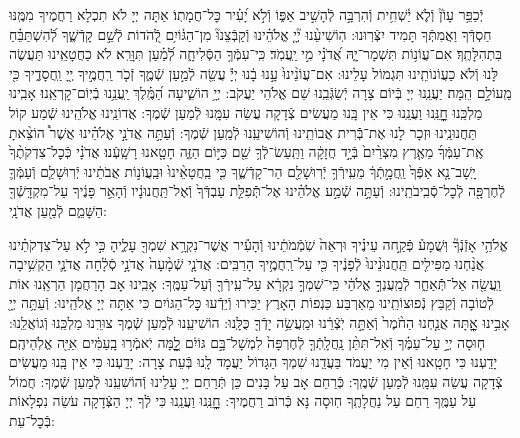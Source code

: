 \documentclass[twoside, openany, parskip=half, 11pt]{book}
\begin{document}
יְֿכַפֵּ֥ר עָוֹן֘ וְֿלֹ֢א יַ֫שְׁחִ֥ית וְֿהִרְבָּ֣ה לְֿהָשִׁ֣יב אַפּ֑וֹ וְֿלֹ֣א יָ֝עִ֗יר כׇּל־חֲמָתֽוֹ׃ אַתָּה יְיָ לֹא תִכְלָא רַחֲמֶיךָ מִמֶּֽנּוּ חַסְדְּֿךָ וַאֲמִתְּֿךָ תָּמִיד יִצְּֿרֽוּנוּ: הֽוֹשִׁיעֵ֨נוּ יְ֘יָ֤ אֱלֹהֵ֗ינוּ וְֿקַבְּֿצֵנוּ֘ מִן־הַגּ֫וֹיִ֥ם לְֿ֭הֹדוֹת לְֿשֵׁ֣ם קָדְֿשֶׁ֑ךָ לְֿ֝הִשְׁתַּבֵּ֗חַ בִּתְהִלָּתֶֽךָ׃
אִם־עֲוֹנ֥וֹת תִּשְׁמָר־יָ֑הּ אֲ֝דֹנָ֗י מִ֣י יַֽעֲמֹֽד׃ כִּֽי־עִמְּֿךָ֥ הַסְּֿלִיחָ֑ה לְֿ֝מַ֗עַן תִּוָּרֵֽא׃ לֹא כַחֲטָאֵֽינוּ תַּעֲשֶׂה לָּנוּ וְֿלֹא כַעֲוֹנוֹתֵֽינוּ תִּגְמוֹל עָלֵינוּ:
אִם־עֲוֹנֵ֨ינוּ֙ עָ֣נוּ בָ֔נוּ יְיָ֕ עֲשֵׂ֖ה לְֿמַ֣עַן שְֿׁמֶ֑ךָ זְֿכֹ֤ר רַֽחֲמֶ֣יךָ יְ֖יָ וַֽחֲסָדֶ֑יךָ כִּ֖י מֵֽעוֹלָ֣ם הֵֽמָּה׃ יַעֲנֵֽנוּ יְיָ בְּֿיוֹם צָרָה יְֿשַׂגְּֿבֵֽנוּ שֵׁם אֱלֹהֵי יַעֲקֹב:
יְיָ֥ הוֹשִׁ֑יעָה הַ֝מֶּֽ֗לֶךְ יַֽעֲנֵ֥נוּ בְֿיֽוֹם־קׇרְאֵֽנוּ׃
אָבִֽינוּ מַלְכֵּֽנוּ חׇׇׇׇׇׇׇׇָנֵּֽנוּ וַעֲנֵֽנוּ כִּי אֵין בָּֽנוּ מַעֲשִׂים צְֿדָקָה עֲשֵׂה עִמָּֽנוּ לְֿמַעַן שְֿׁמֶךָ:
אֲדוֹנֵֽינוּ אֱלֹהֵֽינוּ שְֿׁמַע קוֹל תַּחֲנוּנֵֽינוּ וּזְכָר לָנוּ אֶת־בְּֿֿרִית אֲבוֹתֵֽינוּ וְֿהוֹשִׁיעֵֽנוּ לְֿמַֽעַן שְֿׁמֶךָ:
וְֿעַתָּ֣ה אֲדֹנָ֣י אֱלֹהֵ֗ינוּ אֲשֶׁר֩ הוֹצֵ֨אתָ אֶֽת־עַמְּֿךָ֜ מֵאֶ֤רֶץ מִצְרַ֨יִם֙ בְּֿיָ֣ד חֲזָקָ֔ה וַתַּֽעַשׂ־לְֿךָ֥ שֵׁ֖ם כַּיּ֣וֹם הַזֶּ֑ה חָטָ֖אנוּ רָשָֽׁעְֿנוּ׃
אֲדֹנָ֗י כְּֿכׇל־צִדְקֹתֶ֨ךָ֙ יָֽשָׁב־נָ֤א אַפְּֿךָ֙ וַֽחֲמָ֣תְֿךָ֔ מֵעִֽירְֿךָ֥ יְֿרֽוּשָׁלַ֖ם הַר־קָדְֿשֶׁ֑ךָ כִּ֤י בַֽחֲטָאֵ֨ינוּ֙ וּבַֽעֲוֹנ֣וֹת אֲבֹתֵ֔ינוּ יְֿרֽוּשָׁלַ֧ם וְֿעַמְּֿךָ֛ לְֿחֶרְפָּ֖ה לְֿכׇל־סְֿבִֽיבֹתֵֽינוּ:
וְֿעַתָּ֣ה שְֿׁמַ֣ע אֱלֹהֵ֗ינוּ אֶל־תְּֿֿפִלַּ֤ת עַבְדְּֿךָ֙ וְֿאֶל־תַּֽחֲנוּנָ֔יו וְֿהָאֵ֣ר פָּנֶ֔יךָ עַל־מִקְדָּֽשְֿׁךָ֖ הַשָּׁמֵ֑ם לְֿמַ֖עַן אֲדֹנָֽי:

אֱלֹהַ֥י אָזְֿנְֿךָ֘ וּֽשֲׁמָע֒ פְּֿקַ֣חה עֵינֶ֗יךָ וּרְאֵה֙ שֹֽׁמְֿמֹתֵ֔ינוּ וְֿהָעִ֕יר אֲשֶׁר־נִקְרָ֥א שִׁמְךָ֖ עָלֶ֑יהָ כִּ֣י לֹ֣א עַל־צִדְקֹתֵ֗ינוּ אֲנַ֨חְנוּ מַפִּילִ֤ים תַּֽחֲנוּנֵ֨ינוּ֙ לְֿפָנֶ֔יךָ כִּ֖י עַל־רַֽחֲמֶ֥יךָ הָרַבִּֽים: אֲדֹנָ֤י שְֿׁמָ֨עָה֙ אֲדֹנָ֣י סְֿלָ֔חָה אֲדֹנָ֛י הַקְשִׁ֥יבָה וַֽעֲשֵׂ֖ה אַל־תְּֿֿאַחַ֑ר לְֿמַֽעֲנְךָ֣ אֱלֹהַ֔י כִּֽי־שִׁמְךָ֣ נִקְרָ֔א עַל־עִֽירְֿךָ֖ וְֿעַל־עַמֶּֽךָ: אָבִֽינוּ אָב הָרַחֲמָן הַרְאֵֽנוּ אוֹת לְֿטוֹבָה וְֿקַבֵּץ נְֿפוּצוֹתֵֽינוּ מֵאַרְבַּע כַּנְפוֹת הָאָרֶץ יַכִּירוּ וְֿיֵדְֿעוּ כׇּל־הַגּוֹיִם כִּי אַתָּה יְיָ אֱלֹהֵֽינוּ:
וְֿעַתָּ֥ה יְיָ֖ אָבִ֣ינוּ אׇׇׇׇׇׇָֽתָּה אֲנַ֤חְנוּ הַחֹ֨מֶר֙ וְֿאַתָּ֣ה יֹֽצְֿרֵ֔נוּ וּמַֽעֲשֵׂ֥ה יָדְֿךָ֖ כֻּלָּֽנוּ: הוֹשִׁיעֵֽנוּ לְֿמַעַן שְֿׁמֶךָ צוּרֵֽנוּ מַלְכֵּֽנוּ וְֿגוֹאֲלֵֽנוּ:
ח֧וּסָה יְיָ֣ עַל־עַמֶּ֗ךָ וְֿאַל־תִּתֵּ֨ן נַֽחֲלָֽתְֿךָ֤ לְֿחֶרְפָּה֙ לִמְשָׁל־בָּ֣ם גּוֹיִ֔ם לׇׇׇׇָ֚מָּה יֹֽאמְֿר֣וּ בָֽעַמִּ֔ים אַיֵּ֖ה אֱלֹֽהֵיהֶֽם׃ יָדַֽעְנוּ כִּי חָטָֽאנוּ וְֿאֵין מִי יַעֲמֹד בַּעֲדֵֽנוּ שִׁמְךָ הַגָּדוֹל יַעֲמָד לָֽנוּ בְּֿעֵת צָרָה: יָדַֽעְנוּ כִּי אֵין בָּֽנוּ מַעֲשִׂים צְֿדָקָה עֲשֵׂה עִמָּֽנוּ לְֿמַעַן שְֿׁמֶֽךָ: כְּֿרַחֵם אָב עַל בָּנִים כֵּן תְּֿרַחֵם יְיָ עָלֵינוּ וְֿהוֹשִׁעֵֽנוּ לְֿמַעַן שְֿׁמֶךָ: חֲמוֹל עַל עַמֶּֽךָ רַחֵם עַל נַחֲלָתֶֽךָ חֽוּסָה נָּא כְּֿרוֹב רַחֲמֶיךָ: חׇׇׇׇׇׇׇׇָנֵּֽנוּ וַעֲנֵֽנוּ כִּי לְֿךָ יְיָ הַצְּֿדָקָה עֹשֵׂה נִפְלָאוֹת בְּֿכׇל־עֵת:
\end{document}
